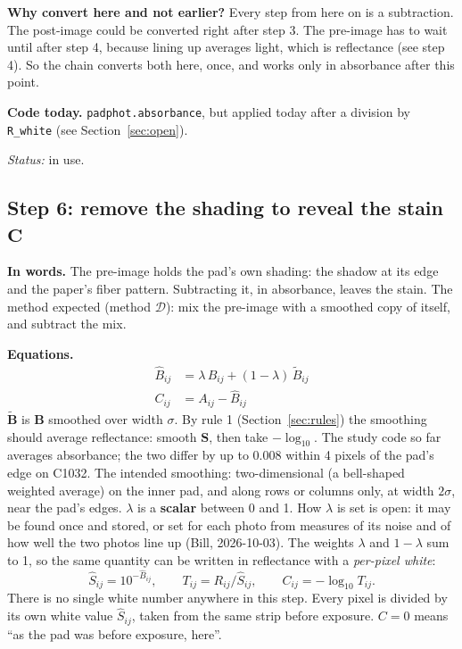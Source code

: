\documentclass[11pt,letter]{article}
\newcommand{\code}[1]{\texttt{#1}}
\newcommand{\SCALAR}{\textbf{scalar}}
\newcommand{\status}[1]{\par\noindent\textit{Status:} #1\par}
\newcommand{\mS}{\mathbf{S}}   %
\newcommand{\mB}{\mathbf{B}}   %
\newcommand{\mC}{\mathbf{C}}   %
\newcommand{\tB}{\widetilde{\mathbf{B}}}   %
\newcommand{\MD}{\mathcal{D}}
\begin{document}
\textbf{Why convert here and not earlier?}  Every step from here on is a
subtraction.  The post-image could be converted right after step 3.  The
pre-image has to wait until after step 4, because lining up averages light,
which is reflectance (see step 4).  So the chain converts both here, once,
and works only in absorbance after this point.

\textbf{Code today.}  \code{padphot.absorbance}, but applied today after a
division by \code{R\_white} (see Section~\ref{sec:open}).

\status{in use.}

\subsection{Step 6: remove the shading to reveal the stain \texorpdfstring{$\mC$}{C}}

\textbf{In words.}  The pre-image holds the pad's own shading: the shadow
at its edge and the paper's fiber pattern.  Subtracting it, in absorbance,
leaves the stain.  The method expected (method $\MD$): mix the pre-image
with a smoothed copy of itself, and subtract the mix.

\textbf{Equations.}
\begin{align}
  \widehat B_{ij} &= \lambda\, B_{ij} + (1 - \lambda)\, \widetilde B_{ij} \\
  C_{ij} &= A_{ij} - \widehat B_{ij}
\end{align}
$\tB$ is $\mB$ smoothed over width $\sigma$.  By rule 1
(Section~\ref{sec:rules}) the smoothing should average reflectance:
smooth $\mS$, then take $-\log_{10}$.  The study code so far averages
absorbance; the two differ by up to 0.008 within 4 pixels of the pad's edge
on C1032.
The intended smoothing:
two-dimensional (a bell-shaped weighted average) on the inner pad, and
along rows or columns only, at width $2\sigma$, near the pad's edges.
$\lambda$ is a \SCALAR{} between 0 and 1.
How $\lambda$ is set is open: it may be found once and stored, or set
for each photo from measures of its noise and of how well the two photos
line up (Bill, 2026-10-03).
The weights $\lambda$ and $1 - \lambda$ sum to 1,
so the same quantity can be written in reflectance with a \emph{per-pixel white}:
\begin{equation}
  \widehat S_{ij} = 10^{-\widehat B_{ij}}, \qquad T_{ij} = R_{ij} / \widehat S_{ij},
  \qquad C_{ij} = -\log_{10} T_{ij}.
\end{equation}
There is no single white number anywhere in this step.  Every pixel is
divided by its own white value $\widehat S_{ij}$, taken from the same strip
before exposure.  $C = 0$ means ``as the pad was before exposure, here''.
\end{document}
